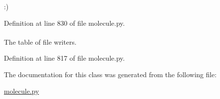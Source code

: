 \-:) 

\-Definition at line 830 of file molecule.\-py.

\hypertarget{classforcebalance_1_1molecule_1_1Molecule_a950a2ec0b5697bf88f192dec676825fc}{
\paragraph[{\-Write\-\_\-\-Tab}]{}}\label{classforcebalance_1_1molecule_1_1Molecule_a950a2ec0b5697bf88f192dec676825fc}


\-The table of file writers. 



\-Definition at line 817 of file molecule.\-py.



\-The documentation for this class was generated from the following file\-:\begin{DoxyCompactItemize}
\item 
\hyperlink{molecule_8py}{molecule.\-py}\end{DoxyCompactItemize}
